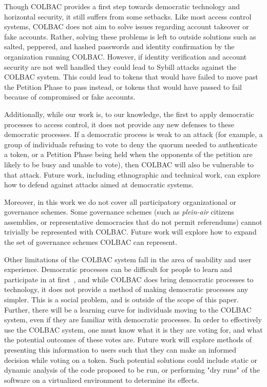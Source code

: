 Though COLBAC provides a first step towards democratic technology and horizontal
security, it still suffers from some setbacks. Like most access control
systems, COLBAC does not aim to solve issues regarding account takeover or fake
accounts. Rather, solving these problems is left to outside solutions such as
salted, peppered, and hashed passwords and identity confirmation by the
organization running COLBAC. However, if identity verification and account
security are not well handled they could lead to Sybill attacks against the
COLBAC system. This could lead to tokens that would have failed to move past the
Petition Phase to pass instead, or tokens that would have passed to fail because
of compromised or fake accounts. 

Additionally, while our work is, to our knowledge, the first to apply democratic
processes to access control, it does not provide any new defenses to these
democratic processes. If a democratic process is weak to an attack (for example,
a group of individuals refusing to vote to deny the quorum needed to
authenticate a token, or a Petition Phase being held when the opponents of the
petition are likely to be busy and unable to vote), then COLBAC will also be
vulnerable to that attack. Future work, including ethnographic and technical
work, can explore how to defend against attacks aimed at democratic systems.

Moreover, in this work we do not cover all participatory organizational or
governance schemes. Some governance schemes (such as \textit{plein-air} citizens
assemblies, or representative democracies that do not permit referendums) cannot
trivially be represented with COLBAC. Future work will explore how to expand the
set of governance schemes COLBAC can represent.

Other limitations of the COLBAC system fall in the area of usability and user
experience. Democratic processes can be difficult for people to learn and
participate in at first~\cite{polletta2012freedom}, and while COLBAC does bring democratic processes
to technology, it does not provide a method of making democratic processes any
simpler. This is a social problem, and is outside of the scope of this paper. Further, there will be a learning curve for individuals moving to the
COLBAC system, even if they are familiar with democratic processes. In order to
effectively use the COLBAC system, one must know what it is they are voting for,
and what the potential outcomes of these votes are. Future work will explore
methods of presenting this information to users such that they can make an
informed decision while voting on a token. Such potential solutions could
include static or dynamic analysis of the code proposed to be run, or performing
"dry runs" of the software on a virtualized environment to determine its
effects.

